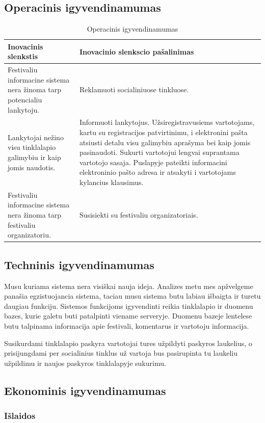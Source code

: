 ﻿\documentclass{VUMIFPSkursinis}
\begin{document}
\subsection{Operacinis igyvendinamumas}
\begin{longtable}{|p{0,45\linewidth}|p{0,45\linewidth}|}
\caption{Operacinis igyvendinamumas}\\
	\hline
	Inovacinis slenkstis & Inovacinio slenkscio pašalinimas\\
	\hline
	Festivaliu informacine sistema nera žinoma tarp potencialiu lankytoju. &
	Reklamuoti socialiniuose tinkluose.\\
	\hline
	Lankytojai nežino visu tinklalapio galimybiu ir kaip jomis naudotis. &
	Informuoti lankytojus. Užsiregistravusiems vartotojams, kartu su registracijos patvirtinimu, i elektronini pašta atsiusti detalu visu galimybiu aprašyma bei kaip jomis pasinaudoti. Sukurti vartotojui lengvai suprantama vartotojo sasaja. Puslapyje pateikti informacini elektroninio pašto adresa ir atsakyti i vartotojams kylancius klausimus.\\
	\hline
	Festivaliu informacine sistema nera žinoma tarp festivaliu organizatoriu. & Susisiekti su festivaliu organizatoriais.\\
	\hline
\end{longtable}
\subsection{Techninis igyvendinamumas}
Musu kuriama sistema nera visiškai nauja ideja. Analizes metu mes apžvelgeme panašia egzistuojancia sistema, taciau musu sistema butu labiau išbaigta ir turetu daugiau funkciju. Sistemos funkcijoms igyvendinti reikia tinklalapio ir duomenu bazes, kurie galetu buti patalpinti viename serveryje. Duomenu bazeje lentelese butu talpinama informacija apie festivali, komentarus ir vartotoju informacija.

Susikurdami tinklalapio paskyra vartotojai tures užpildyti paskyros laukelius, o prisijungdami per socialinius tinklus už vartoja bus pasirupinta tu laukeliu užpildimu ir naujos paskyros tinklalapyje sukurimu.
\subsection{Ekonominis igyvendinamumas}
\subsubsection{Išlaidos}
 
\end{document}
